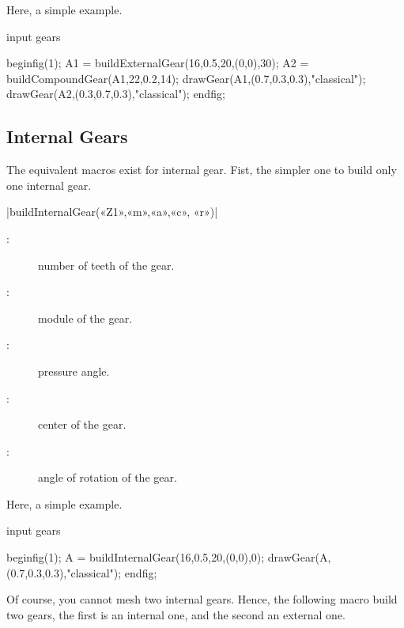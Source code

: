 \documentclass[english]{ltxdoc}
\begin{document}
Here, a simple example.
\begin{ExempleMP}
input gears

beginfig(1);
A1 = buildExternalGear(16,0.5,20,(0,0),30);
A2 = buildCompoundGear(A1,22,0.2,14);
drawGear(A1,(0.7,0.3,0.3),"classical");
drawGear(A2,(0.3,0.7,0.3),"classical");
endfig;
\end{ExempleMP}


\subsection{Internal Gears}\label{sec:internal}

The equivalent macros exist for internal gear. Fist, the simpler one to build
only one internal gear. 

\begin{colourband}
\commande|buildInternalGear(«Z1»,«m»,«a»,«c», «r»)|\smallskip{}
\begin{description}
  \item[:]  number of teeth of the gear.
  \item[:]  module of the gear.
  \item[:]  pressure angle.
  \item[:]  center of the gear.
  \item[:]  angle of rotation of the gear.
\end{description}
\end{colourband}

Here, a simple example.
\begin{ExempleMP}
input gears

beginfig(1);
A = buildInternalGear(16,0.5,20,(0,0),0);
drawGear(A,(0.7,0.3,0.3),"classical");
endfig;
\end{ExempleMP}




Of course, you cannot mesh two
internal gears. Hence, the following macro build two gears, the first is an
internal one, and the second an external one.  
\end{document}
